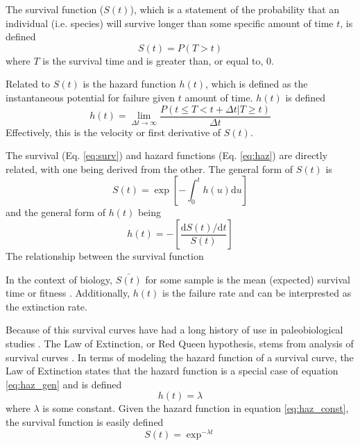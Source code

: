 \documentclass[12pt,letterpaper]{article}
\begin{document}
The survival function (\(S(t)\)), which is a statement of the probability that an individual (i.e. species) will survive longer than some specific amount of time \(t\), is defined
\begin{equation}
  S(t) = P(T > t)
  \label{eq:surv}
\end{equation}
where \(T\) is the survival time and is greater than, or equal to, 0.

Related to \(S(t)\) is the hazard function \(h(t)\), which is defined as the instantaneous potential for failure given \(t\) amount of time. \(h(t)\) is defined 
\begin{equation}
  h(t) = \lim_{\Delta t \to \infty} \frac{P(t \le T < t + \Delta t | T \ge t)}{\Delta t}
  \label{eq:haz}
\end{equation}
Effectively, this is the velocity or first derivative of \(S(t)\).

The survival (Eq. \ref{eq:surv}) and hazard functions (Eq. \ref{eq:haz}) are directly related, with one being derived from the other. The general form of \(S(t)\) is
\begin{equation}
  S(t) = \exp\left[- \int_{0}^{t} h(u) \mathrm{d}u\right]
  \label{eq:surv_gen}
\end{equation}
and the general form of \(h(t)\) being
\begin{equation}
  h(t) = -\left[\frac{\mathrm{d}S(t) / \mathrm{d}t}{S(t)}\right]
  \label{eq:haz_gen}
\end{equation}
The relationship between the survival function 

In the context of biology, \(\bar{S(t)}\) for some sample is the mean (expected) survival time or fitness \citep{Cooper1984}. Additionally, \(h(t)\) is the failure rate and can be interprested as the extinction rate. 

Because of this survival curves have had a long history of use in paleobiological studies \citep{Simpson1953,VanValen1973,Levinton1974,Raup1975,Raup1978,Foote1988,Kitchell1991,Foote2001}. The Law of Extinction, or Red Queen hypothesis, stems from analysis of survival curves \citep{VanValen1973}. In terms of modeling the hazard function of a survival curve, the Law of Extinction states that the hazard function is a special case of equation \ref{eq:haz_gen} and is defined 
\begin{equation}
  h(t) = \lambda
  \label{eq:haz_const}
\end{equation}
where \(\lambda\) is some constant. Given the hazard function in equation \ref{eq:haz_const}, the survival function is easily defined 
\begin{equation}
  S(t) = \exp^{-\lambda t}
  \label{eq:surv_const}
\end{equation}
\end{document}
